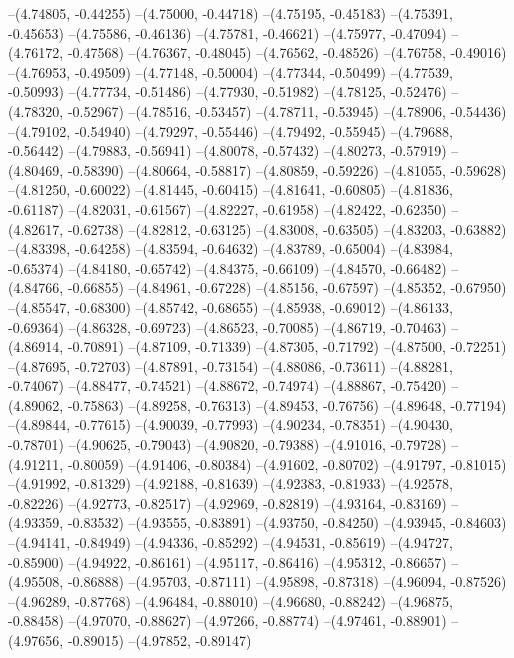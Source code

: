 --(4.74805, -0.44255)
--(4.75000, -0.44718)
--(4.75195, -0.45183)
--(4.75391, -0.45653)
--(4.75586, -0.46136)
--(4.75781, -0.46621)
--(4.75977, -0.47094)
--(4.76172, -0.47568)
--(4.76367, -0.48045)
--(4.76562, -0.48526)
--(4.76758, -0.49016)
--(4.76953, -0.49509)
--(4.77148, -0.50004)
--(4.77344, -0.50499)
--(4.77539, -0.50993)
--(4.77734, -0.51486)
--(4.77930, -0.51982)
--(4.78125, -0.52476)
--(4.78320, -0.52967)
--(4.78516, -0.53457)
--(4.78711, -0.53945)
--(4.78906, -0.54436)
--(4.79102, -0.54940)
--(4.79297, -0.55446)
--(4.79492, -0.55945)
--(4.79688, -0.56442)
--(4.79883, -0.56941)
--(4.80078, -0.57432)
--(4.80273, -0.57919)
--(4.80469, -0.58390)
--(4.80664, -0.58817)
--(4.80859, -0.59226)
--(4.81055, -0.59628)
--(4.81250, -0.60022)
--(4.81445, -0.60415)
--(4.81641, -0.60805)
--(4.81836, -0.61187)
--(4.82031, -0.61567)
--(4.82227, -0.61958)
--(4.82422, -0.62350)
--(4.82617, -0.62738)
--(4.82812, -0.63125)
--(4.83008, -0.63505)
--(4.83203, -0.63882)
--(4.83398, -0.64258)
--(4.83594, -0.64632)
--(4.83789, -0.65004)
--(4.83984, -0.65374)
--(4.84180, -0.65742)
--(4.84375, -0.66109)
--(4.84570, -0.66482)
--(4.84766, -0.66855)
--(4.84961, -0.67228)
--(4.85156, -0.67597)
--(4.85352, -0.67950)
--(4.85547, -0.68300)
--(4.85742, -0.68655)
--(4.85938, -0.69012)
--(4.86133, -0.69364)
--(4.86328, -0.69723)
--(4.86523, -0.70085)
--(4.86719, -0.70463)
--(4.86914, -0.70891)
--(4.87109, -0.71339)
--(4.87305, -0.71792)
--(4.87500, -0.72251)
--(4.87695, -0.72703)
--(4.87891, -0.73154)
--(4.88086, -0.73611)
--(4.88281, -0.74067)
--(4.88477, -0.74521)
--(4.88672, -0.74974)
--(4.88867, -0.75420)
--(4.89062, -0.75863)
--(4.89258, -0.76313)
--(4.89453, -0.76756)
--(4.89648, -0.77194)
--(4.89844, -0.77615)
--(4.90039, -0.77993)
--(4.90234, -0.78351)
--(4.90430, -0.78701)
--(4.90625, -0.79043)
--(4.90820, -0.79388)
--(4.91016, -0.79728)
--(4.91211, -0.80059)
--(4.91406, -0.80384)
--(4.91602, -0.80702)
--(4.91797, -0.81015)
--(4.91992, -0.81329)
--(4.92188, -0.81639)
--(4.92383, -0.81933)
--(4.92578, -0.82226)
--(4.92773, -0.82517)
--(4.92969, -0.82819)
--(4.93164, -0.83169)
--(4.93359, -0.83532)
--(4.93555, -0.83891)
--(4.93750, -0.84250)
--(4.93945, -0.84603)
--(4.94141, -0.84949)
--(4.94336, -0.85292)
--(4.94531, -0.85619)
--(4.94727, -0.85900)
--(4.94922, -0.86161)
--(4.95117, -0.86416)
--(4.95312, -0.86657)
--(4.95508, -0.86888)
--(4.95703, -0.87111)
--(4.95898, -0.87318)
--(4.96094, -0.87526)
--(4.96289, -0.87768)
--(4.96484, -0.88010)
--(4.96680, -0.88242)
--(4.96875, -0.88458)
--(4.97070, -0.88627)
--(4.97266, -0.88774)
--(4.97461, -0.88901)
--(4.97656, -0.89015)
--(4.97852, -0.89147)
